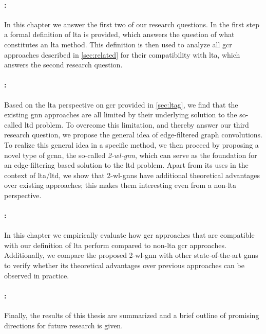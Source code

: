 \paragraph{: }
In this chapter we answer the first two of our research questions.
In the first step a formal definition of \ac{lta} is provided, which answers the question of what constitutes an \ac{lta} method.
This definition is then used to analyze all \ac{gcr} approaches described in \cref{sec:related} for their compatibility with \ac{lta}, which answers the second research question.

\paragraph{: }
Based on the \ac{lta} perspective on \ac{gcr} provided in \cref{sec:ltag}, we find that the existing \ac{gnn} approaches are all limited by their underlying solution to the so-called \ac*{ltd} problem.
To overcome this limitation, and thereby answer our third research question, we propose the general idea of edge-filtered graph convolutions.
To realize this general idea in a specific method, we then proceed by proposing a novel type of \ac*{gcnn}, the so-called \textit{2-\acs*{wl}-\acs{gnn}}, which can serve as the foundation for an edge-filtering based solution to the \acs*{ltd} problem.
Apart from its uses in the context of \ac{lta}/\acs*{ltd}, we show that 2-\acs*{wl}-\acsp{gnn} have additional theoretical advantages over existing approaches;
this makes them interesting even from a non-\acs{lta} perspective.

\paragraph{: }
In this chapter we empirically evaluate how \ac{gcr} approaches that are compatible with our definition of \ac{lta} perform compared to non-\acs{lta} \ac{gcr} approaches.
Additionally, we compare the proposed 2-\acs*{wl}-\acs{gnn} with other state-of-the-art \acp{gnn} to verify whether its theoretical advantages over previous approaches can be observed in practice.

\paragraph{: }
Finally, the results of this thesis are summarized and a brief outline of promising directions for future research is given.
